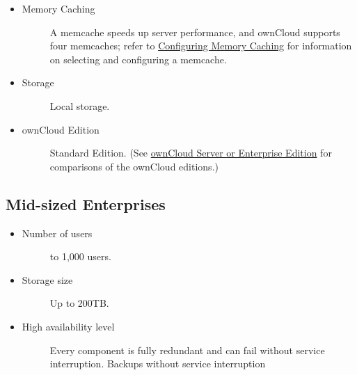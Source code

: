 \documentclass[letterpaper,10pt,english]{sphinxmanual}
\begin{document}
\begin{itemize}
\begin{description}
\end{description}

\item {} \begin{description}
\item[{Memory Caching}] \leavevmode
A memcache speeds up server performance, and ownCloud supports four
memcaches; refer to \href{https://doc.owncloud.org/server/9.0/admin\_manual/configuration\_server/caching\_configuration.html}{Configuring Memory Caching} for information on
selecting and configuring a memcache.

\end{description}

\item {} \begin{description}
\item[{Storage}] \leavevmode
Local storage.

\end{description}

\item {} \begin{description}
\item[{ownCloud Edition}] \leavevmode
Standard Edition. (See \href{https://owncloud.com/owncloud-server-or-enterprise-edition/}{ownCloud Server or Enterprise Edition} for
comparisons of the ownCloud editions.)

\end{description}

\end{itemize}


\subsection{Mid-sized Enterprises}
\label{installation/deployment_recommendations:mid-sized-enterprises}\begin{itemize}
\item {} \begin{description}
\item[{Number of users}]  to 1,000 users.

\end{description}

\item {} \begin{description}
\item[{Storage size}] \leavevmode
Up to 200TB.

\end{description}

\item {} \begin{description}
\item[{High availability level}] \leavevmode
Every component is fully redundant and can fail without service interruption.
Backups without service interruption

\end{description}

\end{itemize}
\end{document}
